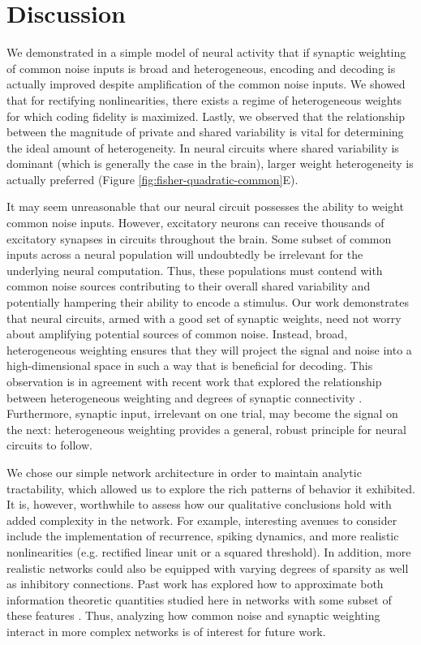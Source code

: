 \documentclass[12pt]{article}
\begin{document}
\section{Discussion}

We demonstrated in a simple model of neural activity that if synaptic weighting of common noise inputs is broad and heterogeneous, encoding and decoding is actually improved despite amplification of the common noise inputs. We showed that for rectifying nonlinearities, there exists a regime of heterogeneous weights for which coding fidelity is maximized. Lastly, we observed that the relationship between the magnitude of private and shared variability is vital for determining the ideal amount of heterogeneity. In neural circuits where shared variability is dominant (which is generally the case in the brain), larger weight heterogeneity is actually preferred (Figure \ref{fig:fisher-quadratic-common}E).

It may seem unreasonable that our neural circuit possesses the ability to weight common noise inputs. However, excitatory neurons can receive thousands of excitatory synapses in circuits throughout the brain. Some subset of common inputs across a neural population will undoubtedly be irrelevant for the underlying neural computation. Thus, these populations must contend with common noise sources contributing to their overall shared variability and potentially hampering their ability to encode a stimulus. Our work demonstrates that neural circuits, armed with a good set of synaptic weights, need not worry about amplifying potential sources of common noise. Instead, broad, heterogeneous weighting ensures that they will project the signal and noise into a high-dimensional space in such a way that is beneficial for decoding.  This observation is in agreement with recent work that explored the relationship between heterogeneous weighting and degrees of synaptic connectivity \citep{litwin-kumar2017}. Furthermore, synaptic input, irrelevant on one trial, may become the signal on the next: heterogeneous weighting provides a general, robust principle for neural circuits to follow. 

We chose our simple network architecture in order to maintain analytic tractability, which allowed us to explore the rich patterns of behavior it exhibited. It is, however, worthwhile to assess how our qualitative conclusions hold with added complexity in the network. For example, interesting avenues to consider include the implementation of recurrence, spiking dynamics, and more realistic nonlinearities (e.g. rectified linear unit or a squared threshold). In addition, more realistic networks could also be equipped with varying degrees of sparsity as well as inhibitory connections. Past work has explored how to approximate both information theoretic quantities studied here in networks with some subset of these features \citep{beck2011, yarrow2012}. Thus, analyzing how common noise and synaptic weighting interact in more complex networks is of interest for future work.
\end{document}
